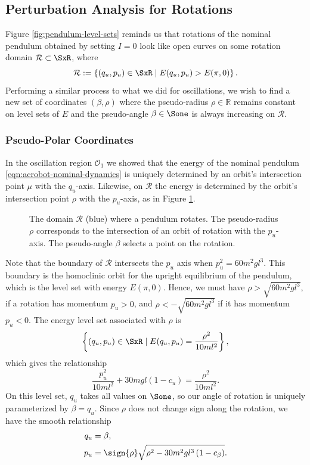 \subsection{Perturbation Analysis for Rotations}
Figure \ref{fig:pendulum-level-sets} reminds us that rotations of the 
nominal pendulum obtained by setting \(I = 0\) look like open curves on some
rotation domain \(\mathcal{R} \subset \SxR\), where
\[
    \mathcal{R} := \left\{ (q_u,p_u) \in \SxR \mid E(q_u,p_u) > E(\pi,0)\right\}
    .
\]
Performing a similar process to what we did for oscillations,
we wish to find a new set of coordinates \((\beta,\rho)\)
where the pseudo-radius \(\rho \in \mathbb{R}\) remains constant on level sets
of \(E\) and the pseudo-angle \(\beta \in \Sone\) is always increasing on
\(\mathcal{R}\).

\subsubsection*{Pseudo-Polar Coordinates}

In the oscillation region \(\mathcal{O}_1\) we showed that the energy of the
nominal pendulum \eqref{eqn:acrobot-nominal-dynamics} is uniquely determined by
an orbit's intersection point \(\mu\) with the \(q_u\)-axis.
Likewise, on \(\mathcal{R}\) the energy is determined by the orbit's intersection
point \(\rho\) with the \(p_u\)-axis, as in Figure \ref{fig:rho-intersection}.

\begin{figure}
    \centering
    
    \caption{The domain \(\mathcal{R}\) (blue) where a pendulum rotates. The
        pseudo-radius \(\rho\) corresponds to the intersection of an orbit of
        rotation with the \(p_u\)-axis. The pseudo-angle \(\beta\) selects a
        point on the rotation.}
    \label{fig:rho-intersection}
\end{figure}

Note that the boundary of \(\mathcal{R}\) intersects the \(p_u\) axis when 
\(p_u^2 = 60m^2 g l^3\). 
This boundary is the homoclinic orbit for the
upright equilibrium of the pendulum, which is the level set with energy
\(E(\pi,0)\).
Hence, we must have \(\rho > \sqrt{60 m^2 g l^3}\), if a
rotation has momentum \(p_u > 0\), 
and \(\rho < -\sqrt{60 m^2 g l^3}\) if it has momentum \(p_u < 0\).
The energy level set associated with \(\rho\) is 
\[
    \left\{(q_u,p_u) \in \SxR \mid E(q_u,p_u) = \frac{\rho^2}{10ml^2}\right\}
    ,
\]
which gives the relationship
\begin{equation}\label{eqn:rotation-pu2}
    \frac{p_u^2}{10m l^2} + 30mgl(1 - c_u) = \frac{\rho^2}{10 ml^2}
    .
\end{equation}
On this level set, \(q_u\) takes all values on \(\Sone\), so our angle of
rotation is uniquely parameterized by \(\beta = q_u\).
Since \(\rho\) does not change sign along the rotation, we have the smooth
relationship
\begin{align}\label{eqn:rotation-Tinv}
    q_u &= \beta
    , \\
    p_u &= \sign{\rho}\sqrt{\rho^2 - 30 m^2 g l^3\left(1 - c_\beta \right)}
    .
\end{align}

